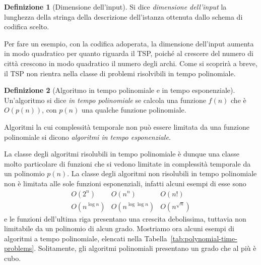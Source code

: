 \documentclass[10pt]{\classname}
\theoremstyle{newlinethm}
\theoremstyle{theorem}
\theoremstyle{definition}
\newtheorem{definizione}{Definizione}[section]
\theoremstyle{definition}
\theoremstyle{definition}
\theoremstyle{definition}
\begin{document}
\begin{definizione}[Dimensione dell'input] Si dice \emph{dimensione dell'input} la lunghezza della stringa della descrizione dell'istanza ottenuta dallo schema di codifica scelto.
\end{definizione}
Per fare un esempio, con la codifica adoperata, la dimensione dell'input aumenta in modo quadratico per quanto riguarda il TSP, poiché al crescere del numero di città crescono in modo quadratico il numero degli archi. Come si scoprirà a breve, il TSP non rientra nella classe di problemi risolvibili in tempo polinomiale.

\begin{definizione}[Algoritmo in tempo polinomiale e in tempo esponenziale]
    Un'algoritmo si dice \emph{in tempo polinomiale} se calcola una funzione $f(n)$ che è $O(p(n))$, con $p(n)$ una qualche funzione polinomiale.

    Algoritmi la cui complessità temporale non può essere limitata da una funzione polinomiale si dicono \emph{algoritmi in tempo esponenziale}.
\end{definizione}

La classe degli algoritmi risolubili in tempo polinomiale è dunque una classe molto particolare di funzioni che si vedono limitate in complessità temporale da un polinomio $p(n)$. La classe degli algoritmi non risolubili in tempo polinomiale non è limitata alle sole funzioni esponenziali, infatti alcuni esempi di esse sono
\[
\begin{array}{ccc}
    O(2^n) & O(n^n) & O(n!) \\
    O(n^{\log n}) & O(n^{\log \log n}) & O(n^{\sqrt{n}})
\end{array}
\]
e le funzioni dell'ultima riga presentano una crescita debolissima, tuttavia non limitabile da un polinomio di alcun grado. Mostriamo ora alcuni esempi di algoritmi a tempo polinomiale, elencati nella Tabella~\ref{tab:polynomial-time-problems}. Solitamente, gli algoritmi polinomiali presentano un grado che al più è cubo.
\end{document}
